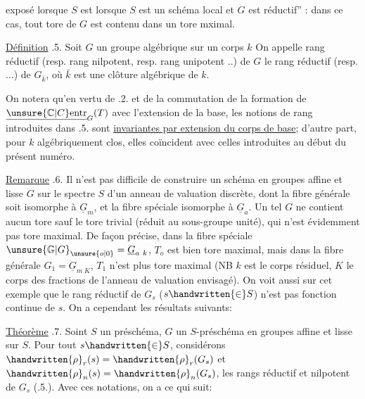 exposé     lorsque $S$ est  \handwritten{,}     lorsque $S$ est un schéma local et $G$ est \handwritten{\textquotedblleft}réductif'' : dans ce cas, tout tore de $G$ est contenu dans un tore mximal.

\uline{Définition} .5. Soit $G$ un groupe algébrique sur un corps $k$  On appelle rang réductif (resp. rang nilpotent, resp. rang unipotent ..) de $G$ le rang réductif (resp. ...) de $G_{\bar k}$, où $\bar k$ est une clôture algébrique de $k$.

On notera qu'en vertu de .2. et de la commutation de la formation de $\underline{\unsure{\mathbb C|C}\mathrm{entr}}_G(T)$ avec l'extension de la base,  les  notions de rang introduites dans .5. sont \uline{invariantes par extension du corps de base}; d'autre part, pour $k$ algébriquement clos, elles coïncident avec celles introduites au début du présent numéro.

\uline{Remarque} .6. Il n'est pas difficile de construire un schéma en groupes affine et lisse $G$ sur le spectre $S$ d'un anneau de valuation discrète, dont la fibre générale soit isomorphe à $\underline G_m$, et la fibre spéciale isomorphe à $\underline G_a$. Un tel $G$ ne contient aucun tore sauf le tore trivial  (réduit au sous-groupe unité), qui n'est évidemment pas tore maximal. De façon précise, dans la fibre spéciale $\unsure{\mathbb G|G}_{\unsure{o|0}}=\underline G_{a\ k}$, $T_o$ est bien tore maximal, mais dans la fibre générale $G_1=\underline G_{m\ K}$, $T_1$ n'est plus tore maximal (NB $k$ est le corps résiduel, $K$ le corps des fractions de l'anneau de valuation envisagé). On voit aussi sur cet exemple que le rang réductif de $G_s$ ($s\handwritten{\in}S$) n'est pas fonction continue de $s$. On a cependant les résultats suivants:

\uline{Théorème} .7. Soint $S$ un préschéma, $G$ un $S$-préschéma en groupes affine et lisse sur $S$. Pour tout $s\handwritten{\in}S$, considérons $\handwritten{\rho}_r(s)=\handwritten{\rho}_r(G_s)$ et $\handwritten{\rho}_n(s)=\handwritten{\rho}_n(G_s)$, les rangs réductif et nilpotent de $G_s$ (.5.). Avec ces notations, on a ce qui suit:
